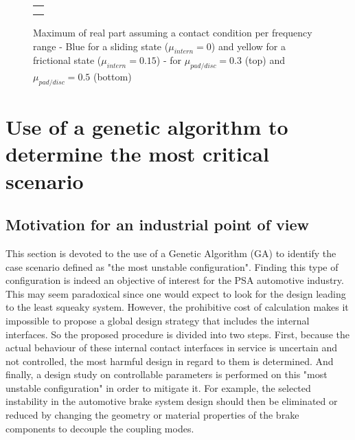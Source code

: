 \documentclass[final,1p]{elsarticle}
\begin{document}
\begin{figure}[tb]
	\vspace*{-4cm}
	\begin{tabularx}{20cm}{Y}
	 \\
	 \\
	\end{tabularx}
	\caption{Maximum of real part assuming a contact condition per frequency range - Blue for a sliding state ($\mu_{intern} = 0$) and yellow for a frictional state ($\mu_{intern}=0.15$) - for $\mu_{pad/disc} = 0.3$ (top) and $\mu_{pad/disc} = 0.5$ (bottom)}
	\label{fig:ContactParFreq}
\end{figure}



\section{Use of a genetic algorithm to determine the most critical scenario}
\label{subsec:}

\subsection{Motivation for an industrial point of view}

This section is devoted to the use of a Genetic Algorithm (GA) to identify the case scenario defined as "the most unstable configuration". Finding this type of configuration is indeed an objective of interest for the PSA automotive industry. This may seem paradoxical since one would expect to look for the design leading to the least squeaky system. However, the prohibitive cost of calculation makes it impossible to propose a global design strategy that includes the internal interfaces. So the proposed procedure is divided into two steps. First, because the actual behaviour of these internal contact interfaces in service is uncertain and not controlled, the most harmful design in regard to them is determined. And finally, a design study on controllable parameters is performed on this "most unstable configuration" in order to mitigate it. For example, the selected instability in the automotive brake system design should then be eliminated or reduced by changing the geometry or material properties of the brake components to decouple the coupling modes.
\end{document}
